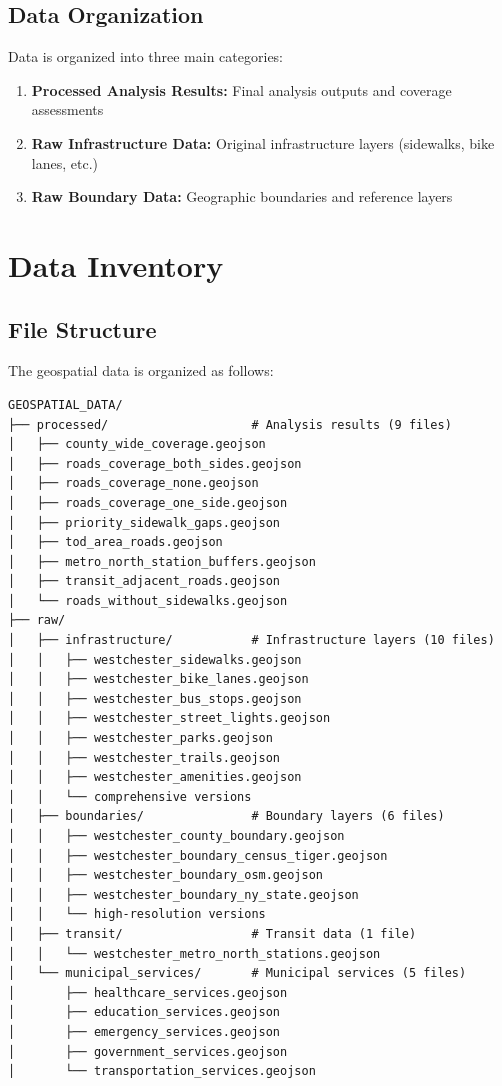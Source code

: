 \documentclass[11pt,letterpaper]{article}
\begin{document}
\subsection{Data Organization}
Data is organized into three main categories:
\begin{enumerate}
    \item \textbf{Processed Analysis Results:} Final analysis outputs and coverage assessments
    \item \textbf{Raw Infrastructure Data:} Original infrastructure layers (sidewalks, bike lanes, etc.)
    \item \textbf{Raw Boundary Data:} Geographic boundaries and reference layers
\end{enumerate}

\section{Data Inventory}

\subsection{File Structure}

The geospatial data is organized as follows:

\begin{verbatim}
GEOSPATIAL_DATA/
├── processed/                    # Analysis results (9 files)
│   ├── county_wide_coverage.geojson
│   ├── roads_coverage_both_sides.geojson
│   ├── roads_coverage_none.geojson
│   ├── roads_coverage_one_side.geojson
│   ├── priority_sidewalk_gaps.geojson
│   ├── tod_area_roads.geojson
│   ├── metro_north_station_buffers.geojson
│   ├── transit_adjacent_roads.geojson
│   └── roads_without_sidewalks.geojson
├── raw/
│   ├── infrastructure/           # Infrastructure layers (10 files)
│   │   ├── westchester_sidewalks.geojson
│   │   ├── westchester_bike_lanes.geojson
│   │   ├── westchester_bus_stops.geojson
│   │   ├── westchester_street_lights.geojson
│   │   ├── westchester_parks.geojson
│   │   ├── westchester_trails.geojson
│   │   ├── westchester_amenities.geojson
│   │   └── comprehensive versions
│   ├── boundaries/               # Boundary layers (6 files)
│   │   ├── westchester_county_boundary.geojson
│   │   ├── westchester_boundary_census_tiger.geojson
│   │   ├── westchester_boundary_osm.geojson
│   │   ├── westchester_boundary_ny_state.geojson
│   │   └── high-resolution versions
│   ├── transit/                  # Transit data (1 file)
│   │   └── westchester_metro_north_stations.geojson
│   └── municipal_services/       # Municipal services (5 files)
│       ├── healthcare_services.geojson
│       ├── education_services.geojson
│       ├── emergency_services.geojson
│       ├── government_services.geojson
│       └── transportation_services.geojson
\end{verbatim}
\end{document}
